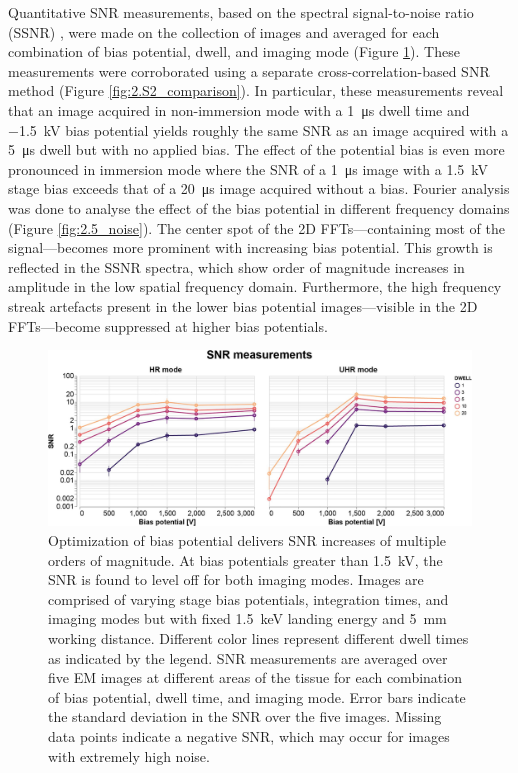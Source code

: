 Quantitative SNR measurements, based on the spectral signal-to-noise ratio (SSNR) \cite{unser1987new}, were made on the collection of images and averaged for each combination of bias potential, dwell, and imaging mode (Figure \ref{fig:2.4_snr}). These measurements were corroborated using a separate cross-correlation-based SNR method \cite{joy2002smart} (Figure \ref{fig:2.S2_comparison}). In particular, these measurements reveal that an image acquired in non-immersion mode with a \SI{1}{\micro\second} dwell time and \SI{-1.5}{\kilo\volt} bias potential yields roughly the same SNR as an image acquired with a \SI{5}{\micro\second} dwell but with no applied bias. The effect of the potential bias is even more pronounced in immersion mode where the SNR of a \SI{1}{\micro\second} image with a \SI{1.5}{\kilo\volt} stage bias exceeds that of a \SI{20}{\micro\second} image acquired without a bias. Fourier analysis was done to analyse the effect of the bias potential in different frequency domains (Figure \ref{fig:2.5_noise}). The center spot of the 2D FFTs—containing most of the signal—becomes more prominent with increasing bias potential. This growth is reflected in the SSNR spectra, which show order of magnitude increases in amplitude in the low spatial frequency domain. Furthermore, the high frequency streak artefacts present in the lower bias potential images---visible in the 2D FFTs---become suppressed at higher bias potentials.

\begin{figure}[!tb]
    \centering
    \includegraphics[width=\linewidth]{chapter-2/figures_JPEG_HQ/fig2-4_snr.jpg}
    \caption{Optimization of bias potential delivers SNR increases of multiple orders of magnitude. At bias potentials greater than \SI{1.5}{\kilo\volt}, the SNR is found to level off for both imaging modes. Images are comprised of varying stage bias potentials, integration times, and imaging modes but with fixed \SI{1.5}{\kilo\electronvolt} landing energy and \SI{5}{\milli\meter} working distance. Different color lines represent different dwell times as indicated by the legend. SNR measurements are averaged over five EM images at different areas of the tissue for each combination of bias potential, dwell time, and imaging mode. Error bars indicate the standard deviation in the SNR over the five images. Missing data points indicate a negative SNR, which may occur for images with extremely high noise.}
    \label{fig:2.4_snr}
\end{figure}


